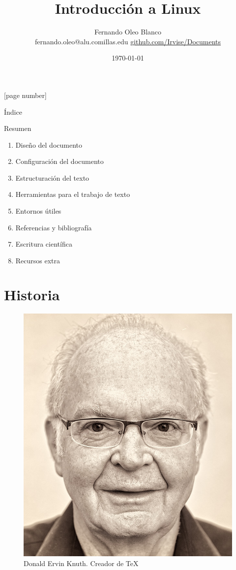 \documentclass[12pt]{beamer}
\begin{document}
	\author{Fernando Oleo Blanco \\ fernando.oleo@alu.comillas.edu \hfill 	\href{https://github.com/Irvise/Documents}{github.com/Irvise/Documents}}
	\title{Introducción a Linux}
	\date{\today}
	[page number]
\begin{frame}[plain]
	\maketitle
\end{frame}

\begin{frame}{Índice}
\tableofcontents
\end{frame}

\begin{frame}{Resumen}
\begin{enumerate}
	\item Diseño del documento
	\item Configuración del documento
	\item Estructuración del texto
	\item Herramientas para el trabajo de texto
	\item Entornos útiles
	\item Referencias y bibliografía
	\item Escritura científica
	\item Recursos extra
\end{enumerate}
\end{frame}

\section{Historia}

\begin{frame}[plain]
	\begin{figure}
		\centering
		\includegraphics[height=0.75\linewidth]{Donald-Knuth-Stanford-Computer-Science}
		\caption{Donald Ervin Knuth. Creador de \TeX}
		\label{fig:donald-knuth-stanford-computer-science}
	\end{figure}
\end{frame}
\end{document}
